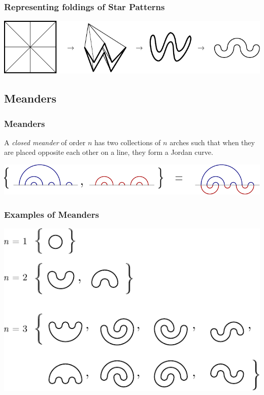 \documentclass{beamer}
\begin{document}
\begin{frame}
\frametitle{Representing foldings of Star Patterns}
\pause
\begin{center}
\includegraphics[width=\textwidth]{meanders/star-to-meander.pdf}
\end{center}
\end{frame}

\subsection{Meanders}
\begin{frame}
\frametitle{Meanders}
\begin{definition}
A \emph{closed meander} of order $n$ has two collections of $n$ arches such that when they are placed opposite each other on a line, they form a Jordan curve.
\end{definition}
\begin{center}
\includegraphics[width=.8\textwidth]{meanders/meander-defn.pdf}
\end{center}
\end{frame}

\begin{frame}
\frametitle{Examples of Meanders}
\begin{center}
\includegraphics[width=.8\textwidth]{meanders/12-and-3.pdf}
\end{center}

\end{frame}
\end{document}
